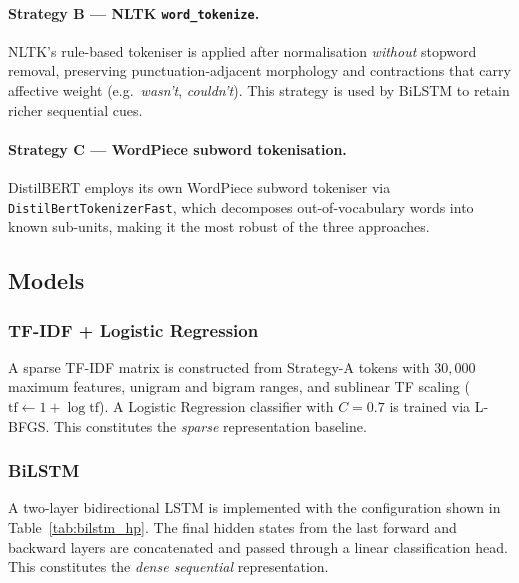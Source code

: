 \paragraph{Strategy B — NLTK \texttt{word\_tokenize}.}
NLTK's rule-based tokeniser is applied after normalisation \emph{without}
stopword removal, preserving punctuation-adjacent morphology and
contractions that carry affective weight (e.g.\ \textit{wasn't},
\textit{couldn't}). This strategy is used by BiLSTM to retain richer
sequential cues.

\paragraph{Strategy C — WordPiece subword tokenisation.}
DistilBERT employs its own WordPiece subword tokeniser via
\texttt{DistilBertTokenizerFast}, which decomposes out-of-vocabulary words
into known sub-units, making it the most robust of the three approaches.

\subsection{Models}

\subsubsection{TF-IDF + Logistic Regression}

A sparse TF-IDF matrix is constructed from Strategy-A tokens with $30{,}000$
maximum features, unigram and bigram ranges, and sublinear TF scaling
($\text{tf} \leftarrow 1+\log\text{tf}$). A Logistic Regression classifier
with $C=0.7$ is trained via L-BFGS. This constitutes the \emph{sparse}
representation baseline.

\subsubsection{BiLSTM}

A two-layer bidirectional LSTM \cite{hochreiter1997lstm} is implemented with
the configuration shown in Table~\ref{tab:bilstm_hp}. The final hidden
states from the last forward and backward layers are concatenated and
passed through a linear classification head. This constitutes the
\emph{dense sequential} representation.

